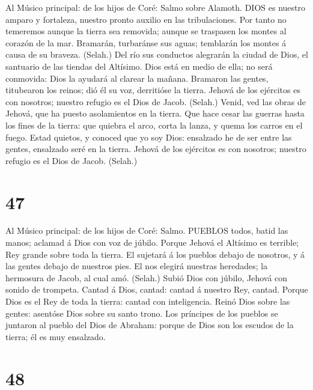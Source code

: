  Al Músico principal: de los hijos de Coré: Salmo sobre
Alamoth. DIOS es nuestro amparo y fortaleza, nuestro pronto auxilio en
las tribulaciones.  Por tanto no temeremos aunque la tierra
sea removida; aunque se traspasen los montes al corazón de la mar.
 Bramarán, turbaránse sus aguas; temblarán los montes á
causa de su braveza. (Selah.)  Del río sus conductos
alegrarán la ciudad de Dios, el santuario de las tiendas del Altísimo.
 Dios está en medio de ella; no será conmovida: Dios la
ayudará al clarear la mañana.  Bramaron las gentes,
titubearon los reinos; dió él su voz, derritióse la tierra. 
Jehová de los ejércitos es con nosotros; nuestro refugio es el Dios de
Jacob. (Selah.)  Venid, ved las obras de Jehová, que ha
puesto asolamientos en la tierra.  Que hace cesar las
guerras hasta los fines de la tierra: que quiebra el arco, corta la
lanza, y quema los carros en el fuego.  Estad quietos, y
conoced que yo soy Dios: ensalzado he de ser entre las gentes, ensalzado
seré en la tierra.  Jehová de los ejércitos es con
nosotros; nuestro refugio es el Dios de Jacob. (Selah.)

\hypertarget{section-46}{%
\section{47}\label{section-46}}

 Al Músico principal: de los hijos de Coré: Salmo. PUEBLOS
todos, batid las manos; aclamad á Dios con voz de júbilo. 
Porque Jehová el Altísimo es terrible; Rey grande sobre toda la tierra.
 El sujetará á los pueblos debajo de nosotros, y á las
gentes debajo de nuestros pies.  El nos elegirá nuestras
heredades; la hermosura de Jacob, al cual amó. (Selah.) 
Subió Dios con júbilo, Jehová con sonido de trompeta. 
Cantad á Dios, cantad: cantad á nuestro Rey, cantad.  Porque
Dios es el Rey de toda la tierra: cantad con inteligencia. 
Reinó Dios sobre las gentes: asentóse Dios sobre su santo trono.
 Los príncipes de los pueblos se juntaron al pueblo del Dios
de Abraham: porque de Dios son los escudos de la tierra; él es muy
ensalzado.

\hypertarget{section-47}{%
\section{48}\label{section-47}}

